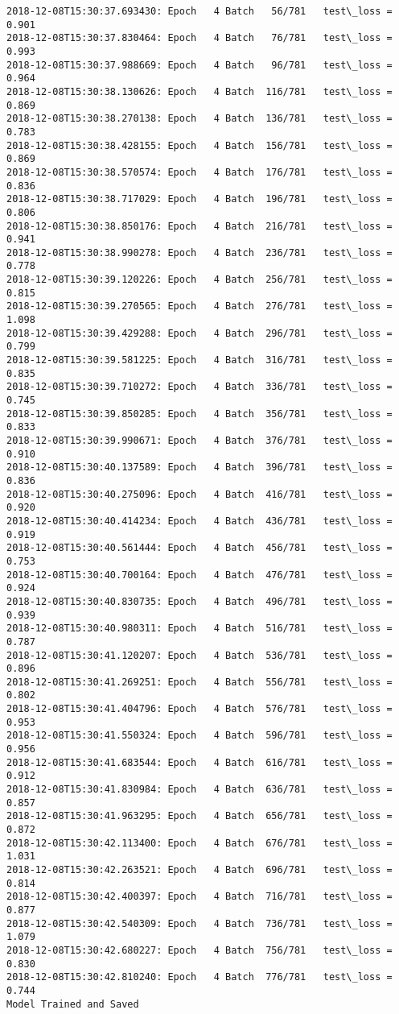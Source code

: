 \documentclass[11pt]{article}
\begin{document}
\begin{Verbatim}[commandchars=\\\{\}]
2018-12-08T15:30:37.693430: Epoch   4 Batch   56/781   test\_loss = 0.901
2018-12-08T15:30:37.830464: Epoch   4 Batch   76/781   test\_loss = 0.993
2018-12-08T15:30:37.988669: Epoch   4 Batch   96/781   test\_loss = 0.964
2018-12-08T15:30:38.130626: Epoch   4 Batch  116/781   test\_loss = 0.869
2018-12-08T15:30:38.270138: Epoch   4 Batch  136/781   test\_loss = 0.783
2018-12-08T15:30:38.428155: Epoch   4 Batch  156/781   test\_loss = 0.869
2018-12-08T15:30:38.570574: Epoch   4 Batch  176/781   test\_loss = 0.836
2018-12-08T15:30:38.717029: Epoch   4 Batch  196/781   test\_loss = 0.806
2018-12-08T15:30:38.850176: Epoch   4 Batch  216/781   test\_loss = 0.941
2018-12-08T15:30:38.990278: Epoch   4 Batch  236/781   test\_loss = 0.778
2018-12-08T15:30:39.120226: Epoch   4 Batch  256/781   test\_loss = 0.815
2018-12-08T15:30:39.270565: Epoch   4 Batch  276/781   test\_loss = 1.098
2018-12-08T15:30:39.429288: Epoch   4 Batch  296/781   test\_loss = 0.799
2018-12-08T15:30:39.581225: Epoch   4 Batch  316/781   test\_loss = 0.835
2018-12-08T15:30:39.710272: Epoch   4 Batch  336/781   test\_loss = 0.745
2018-12-08T15:30:39.850285: Epoch   4 Batch  356/781   test\_loss = 0.833
2018-12-08T15:30:39.990671: Epoch   4 Batch  376/781   test\_loss = 0.910
2018-12-08T15:30:40.137589: Epoch   4 Batch  396/781   test\_loss = 0.836
2018-12-08T15:30:40.275096: Epoch   4 Batch  416/781   test\_loss = 0.920
2018-12-08T15:30:40.414234: Epoch   4 Batch  436/781   test\_loss = 0.919
2018-12-08T15:30:40.561444: Epoch   4 Batch  456/781   test\_loss = 0.753
2018-12-08T15:30:40.700164: Epoch   4 Batch  476/781   test\_loss = 0.924
2018-12-08T15:30:40.830735: Epoch   4 Batch  496/781   test\_loss = 0.939
2018-12-08T15:30:40.980311: Epoch   4 Batch  516/781   test\_loss = 0.787
2018-12-08T15:30:41.120207: Epoch   4 Batch  536/781   test\_loss = 0.896
2018-12-08T15:30:41.269251: Epoch   4 Batch  556/781   test\_loss = 0.802
2018-12-08T15:30:41.404796: Epoch   4 Batch  576/781   test\_loss = 0.953
2018-12-08T15:30:41.550324: Epoch   4 Batch  596/781   test\_loss = 0.956
2018-12-08T15:30:41.683544: Epoch   4 Batch  616/781   test\_loss = 0.912
2018-12-08T15:30:41.830984: Epoch   4 Batch  636/781   test\_loss = 0.857
2018-12-08T15:30:41.963295: Epoch   4 Batch  656/781   test\_loss = 0.872
2018-12-08T15:30:42.113400: Epoch   4 Batch  676/781   test\_loss = 1.031
2018-12-08T15:30:42.263521: Epoch   4 Batch  696/781   test\_loss = 0.814
2018-12-08T15:30:42.400397: Epoch   4 Batch  716/781   test\_loss = 0.877
2018-12-08T15:30:42.540309: Epoch   4 Batch  736/781   test\_loss = 1.079
2018-12-08T15:30:42.680227: Epoch   4 Batch  756/781   test\_loss = 0.830
2018-12-08T15:30:42.810240: Epoch   4 Batch  776/781   test\_loss = 0.744
Model Trained and Saved

    \end{Verbatim}
\end{document}
